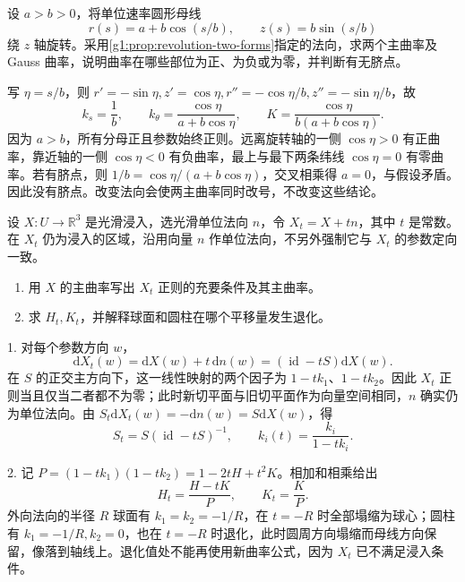 \begin{exercise}\label{g1:ex:torus-curvature-zones}
	设 \(a>b>0\)，将单位速率圆形母线
	\[
		r(s)=a+b\cos(s/b),\qquad z(s)=b\sin(s/b)
	\]
	绕 \(z\) 轴旋转。采用\cref{g1:prop:revolution-two-forms}指定的法向，求两个主曲率及 Gauss 曲率，说明曲率在哪些部位为正、为负或为零，并判断有无脐点。
\end{exercise}
\begin{solution}
	写 \(\eta=s/b\)，则 \(r'=-\sin\eta,z'=\cos\eta,r''=-\cos\eta/b,z''=-\sin\eta/b\)，故
	\[
		k_s=\frac1b,\qquad k_\theta=\frac{\cos\eta}{a+b\cos\eta},\qquad
		K=\frac{\cos\eta}{b(a+b\cos\eta)}.
	\]
	因为 \(a>b\)，所有分母正且参数始终正则。远离旋转轴的一侧 \(\cos\eta>0\) 有正曲率，靠近轴的一侧 \(\cos\eta<0\) 有负曲率，最上与最下两条纬线 \(\cos\eta=0\) 有零曲率。若有脐点，则 \(1/b=\cos\eta/(a+b\cos\eta)\)，交叉相乘得 \(a=0\)，与假设矛盾。因此没有脐点。改变法向会使两主曲率同时改号，不改变这些结论。
\end{solution}

\begin{exercise}\label{g1:ex:parallel-surface}
	设 \(X:U\rightarrow\mathbb R^3\) 是光滑浸入，选光滑单位法向 \(n\)，令 \(X_t=X+tn\)，其中 \(t\) 是常数。在 \(X_t\) 仍为浸入的区域，沿用向量 \(n\) 作单位法向，不另外强制它与 \(X_t\) 的参数定向一致。
	\begin{enumerate}
		\item 用 \(X\) 的主曲率写出 \(X_t\) 正则的充要条件及其主曲率。
		\item 求 \(H_t,K_t\)，并解释球面和圆柱在哪个平移量发生退化。
	\end{enumerate}
\end{exercise}
\begin{solution}
	1. 对每个参数方向 \(w\)，
	\[
		\mathrm{d}X_t(w)=\mathrm{d}X(w)+t\,\mathrm{d}n(w)=(\operatorname{id}-tS)\mathrm{d}X(w).
	\]
	在 \(S\) 的正交主方向下，这一线性映射的两个因子为 \(1-tk_1\)、\(1-tk_2\)。因此 \(X_t\) 正则当且仅当二者都不为零；此时新切平面与旧切平面作为向量空间相同，\(n\) 确实仍为单位法向。由 \(S_t \mathrm{d}X_t(w)=-\mathrm{d}n(w)=S \mathrm{d}X(w)\)，得
	\[
		S_t=S(\operatorname{id}-tS)^{-1},\qquad
		k_i(t)=\frac{k_i}{1-tk_i}.
	\]

	2. 记 \(P=(1-tk_1)(1-tk_2)=1-2tH+t^2K\)。相加和相乘给出
	\[
		H_t=\frac{H-tK}{P},\qquad K_t=\frac K P.
	\]
	外向法向的半径 \(R\) 球面有 \(k_1=k_2=-1/R\)，在 \(t=-R\) 时全部塌缩为球心；圆柱有 \(k_1=-1/R,k_2=0\)，也在 \(t=-R\) 时退化，此时圆周方向塌缩而母线方向保留，像落到轴线上。退化值处不能再使用新曲率公式，因为 \(X_t\) 已不满足浸入条件。
\end{solution}

